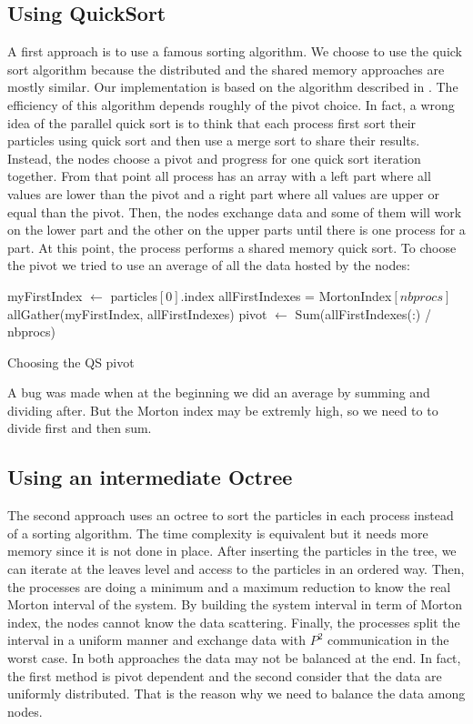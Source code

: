\documentclass[12pt,letterpaper,titlepage]{report}
\begin{document}
\subsection{Using QuickSort}
A first approach is to use a famous sorting algorithm.
We choose to use the quick sort algorithm because the distributed and the shared memory approaches are mostly similar.
Our implementation is based on the algorithm described in \cite{itpc03}.
The efficiency of this algorithm depends roughly of the pivot choice.
In fact, a wrong idea of the parallel quick sort is to think that each process first sort their particles using quick sort and then use a merge sort to share their results.
Instead, the nodes choose a pivot and progress for one quick sort iteration together.
From that point all process has an array with a left part where all values are lower than the pivot and a right part where all values are upper or equal than the pivot.
Then, the nodes exchange data and some of them will work on the lower part and the other on the upper parts until there is one process for a part.
At this point, the process performs a shared memory quick sort.
To choose the pivot we tried to use an average of all the data hosted by the nodes:
\newline
\begin{algorithm}[H]
\linesnumbered
\SetLine
{}
\BlankLine
myFirstIndex $\leftarrow$ particles$[0]$.index\;
allFirstIndexes = MortonIndex$[nbprocs]$\;
allGather(myFirstIndex, allFirstIndexes)\;
pivot $\leftarrow$ Sum(allFirstIndexes(:) / nbprocs)\;
\BlankLine
\caption{Choosing the QS pivot}
\end{algorithm}
\newline
A bug was made when at the beginning we did an average by summing and dividing after. But the Morton index may be extremly high, so we need to to divide first and then sum.

\subsection{Using an intermediate Octree}
The second approach uses an octree to sort the particles in each process instead of a sorting algorithm.
The time complexity is equivalent but it needs more memory since it is not done in place.
After inserting the particles in the tree, we can iterate at the leaves level and access to the particles in an ordered way.
Then, the processes are doing a minimum and a maximum reduction to know the real Morton interval of the system.
By building the system interval in term of Morton index, the nodes cannot know the data scattering.
Finally, the processes split the interval in a uniform manner and exchange data with $P^{2}$ communication in the worst case.
\newline
\newline
In both approaches the data may not be balanced at the end.
In fact, the first method is pivot dependent and the second consider that the data are uniformly distributed.
That is the reason why we need to balance the data among nodes.
\end{document}
